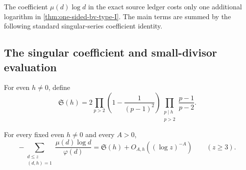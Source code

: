 The coefficient $\mu(d)\log d$ in the exact source ledger costs only one
additional logarithm in \cref{thm:one-sided-bv-type-I}.  The main terms are
summed by the following standard singular-series coefficient identity.

\subsection{The singular coefficient and small-divisor evaluation}
\label{subsec:singular-coefficient}

For even $h\ne0$, define
\begin{equation}\label{eq:pair-singular-series}
 \mathfrak S(h)
 =2\prod_{p>2}\left(1-\frac1{(p-1)^2}\right)
   \prod_{\substack{p\mid h\\p>2}}\frac{p-1}{p-2}.
\end{equation}

\begin{lemma}
\label{lem:singular-series-coefficient}
For every fixed even $h\ne0$ and every $A>0$,
\begin{equation}\label{eq:singular-coefficient-limit}
 -\sum_{\substack{d\leq z\\(d,h)=1}}
   \frac{\mu(d)\log d}{\varphi(d)}
 =\mathfrak S(h)+O_{A,h}((\log z)^{-A})
 \qquad (z\geq3).
\end{equation}
\end{lemma}

